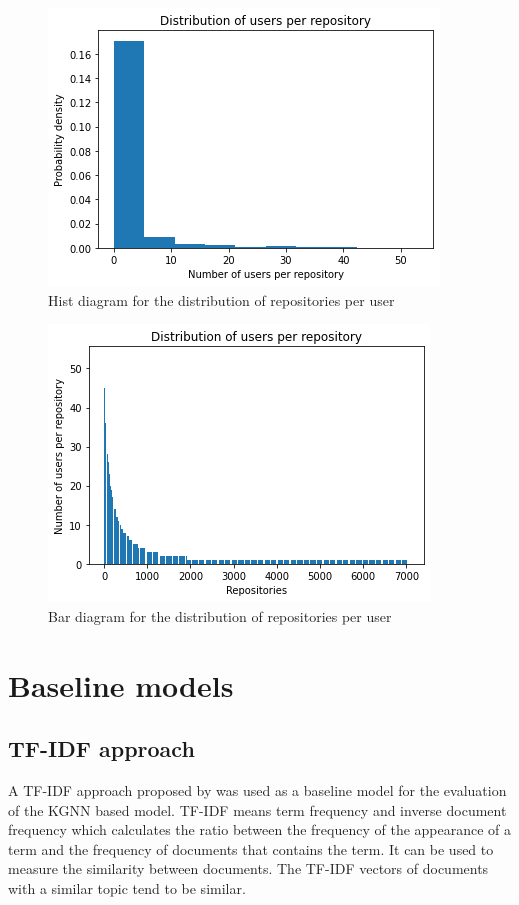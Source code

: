 \documentclass[11pt,twoside]{report}
\begin{document}
\begin{figure}[H]
    \centering
    \includegraphics[scale=0.9]{user_repo_dist_hist.png}
    \caption{Hist diagram for the distribution of repositories per user}
    \label{fig:user_repo_dist_hist}
\end{figure}

\begin{figure}[H]
    \centering
    \includegraphics[scale=0.9]{user_repo_dist_bar.png}
    \caption{Bar diagram for the distribution of repositories per user}
    \label{fig:user_repo_dist_bar}
\end{figure}

\section{Baseline models}
\subsection{TF-IDF approach}
A TF-IDF approach proposed by \cite{sun_personalized_2018} was used as a baseline model for the evaluation of the KGNN based model. TF-IDF means term frequency and inverse document frequency which calculates the ratio between the frequency of the appearance of a term and the frequency of documents that contains the term. It can be used to measure the similarity between documents. The TF-IDF vectors of documents with a similar topic tend to be similar.
\end{document}
